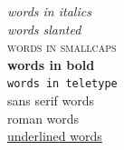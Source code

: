 \documentclass[a4paper,12pt]{article}
\begin{document}
\noindent
\textit{words in italics} \\
\textsl{words slanted} \\
\textsc{words in smallcaps} \\
\textbf{words in bold} \\
\texttt{words in teletype} \\
\textsf{sans serif words} \\
\textrm{roman words} \\
\underline{underlined words}
\end{document}
